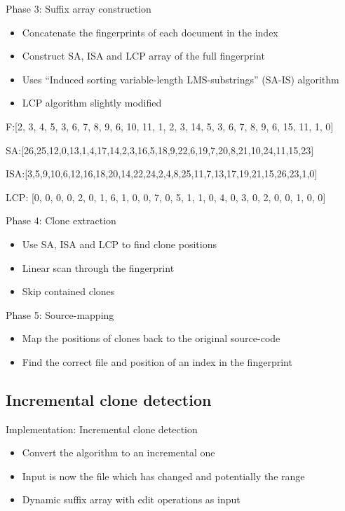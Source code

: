 \documentclass[aspectratio=1610, xcolor=table]{beamer}
\begin{document}
\begin{frame}[fragile]{Phase 3: Suffix array construction}
    \begin{itemize}
        \item Concatenate the fingerprints of each document in the index
        \item Construct SA, ISA and LCP array of the full fingerprint
        \item Uses ``Induced sorting variable-length LMS-substrings'' (SA-IS) algorithm
        \item LCP algorithm slightly modified
    \end{itemize}
    \begin{center}
        F:[2, 3, 4, 5, 3, 6, 7, 8, 9, 6, 10, 11, 1, 2, 3, 14, 5, 3, 6, 7, 8, 9, 6, 15, 11, 1, 0]

        SA:[26,25,12,0,13,1,4,17,14,2,3,16,5,18,9,22,6,19,7,20,8,21,10,24,11,15,23]

        ISA:[3,5,9,10,6,12,16,18,20,14,22,24,2,4,8,25,11,7,13,17,19,21,15,26,23,1,0]

        LCP: [0, 0, 0, 0, 2, 0, 1, 6, 1, 0, 0, 7, 0, 5, 1, 1, 0, 4, 0, 3, 0, 2, 0, 0, 1, 0, 0]
    \end{center}

\end{frame}

\begin{frame}{Phase 4: Clone extraction}
    \begin{itemize}
        \item Use SA, ISA and LCP to find clone positions
        \item Linear scan through the fingerprint
        \item Skip contained clones
    \end{itemize}
\end{frame}

\begin{frame}{Phase 5: Source-mapping}
    \begin{itemize}
        \item Map the positions of clones back to the original source-code
        \item Find the correct file and position of an index in the fingerprint
    \end{itemize}
\end{frame}


\subsection{Incremental clone detection}
\begin{frame}{Implementation: Incremental clone detection}
    \begin{itemize}
        \item Convert the algorithm to an incremental one
        \item Input is now the file which has changed and potentially the range
        \item Dynamic suffix array with edit operations as input
    \end{itemize}
\end{frame}
\end{document}
